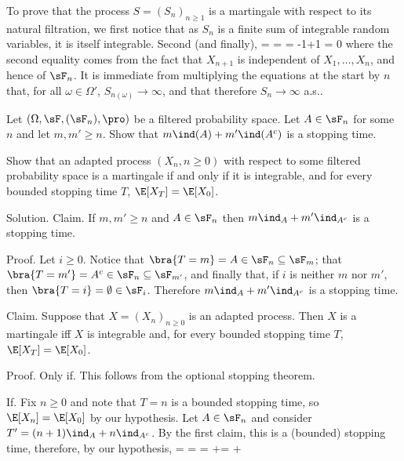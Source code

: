To prove that the process $S = (S_n)_{n\geq 1}$ is a martingale with respect to its natural filtration, we first notice that as $S_n$ is a finite sum of integrable random variables, it is itself integrable. Second (and finally),
\be
\E[S_{n+1}-S_n|\sF_n] = \E[X_{n+1}|\sF_n] = \E[X_{n+1}] = -1+1 = 0
\ee
where the second equality comes from the fact that $X_{n+1}$ is independent of $X_1, \dots ,X_n$, and hence of $\sF_n$. It is immediate from multiplying the equations at the start by $n$ that, for all $\omega \in \Omega'$, $S_{n(\omega)} \to \infty$, and that therefore $S_n \to \infty$ a.s..

\vspace{2mm}

\qcutline


\item Let $(\Omega,\sF, (\sF_n), \pro)$ be a filtered probability space. Let $A \in \sF_n$ for some $n$ and let $m,m' \geq n$. Show that $m\ind(A) + m'\ind(A^c)$ is a stopping time.

Show that an adapted process $(X_n, n \geq  0)$ with respect to some filtered probability space is a martingale if and only if it is integrable, and for every bounded stopping time $T$, $\E[X_T ] = \E[X_0]$.

\scutline

Solution. Claim. If $m,m' \geq n$ and $A \in \sF_n$ then $m\ind_A+m'\ind_{A^c}$ is a stopping time.

Proof. Let $i \geq 0$. Notice that $\bra{T = m} = A \in \sF_n \subseteq \sF_m$; that $\bra{T = m'} = A^c \in \sF_n \subseteq \sF_{m'}$, and finally that, if $i$ is neither $m$ nor $m'$, then $\bra{T = i} = \emptyset \in \sF_i$. Therefore $m\ind_A+m'\ind_{A^c}$ is a stopping time.

Claim. Suppose that $X = (X_n)_{n\geq 0}$ is an adapted process. Then $X$ is a martingale iff $X$ is integrable and, for every bounded stopping time $T$, $\E[X_T ] = \E[X_0]$.

Proof. Only if. This follows from the optional stopping theorem.

If. Fix $n \geq 0$ and note that $T = n$ is a bounded stopping time, so $\E[X_n] = \E[X_0]$ by our hypothesis. Let $A \in \sF_n$ and consider $T' =(n+1)\ind_A+ n\ind_{A^c}$. By the first claim, this is a (bounded) stopping time, therefore, by our hypothesis,
\be
\E[X_0] = \E[X_{T'}] =  = \E[X_{n+1}\ind_A]+\E[X_n(1-\ind_A)] = \E[(X_{n+1}-X_n)\ind_A]+\E[X_n]
\ee

